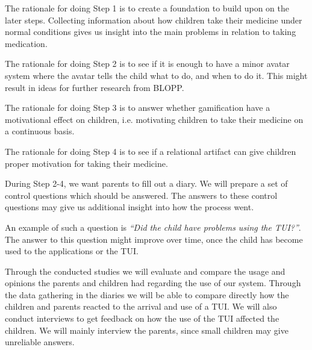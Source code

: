 The rationale for doing Step 1 is to create a foundation to build upon on the later steps. 
Collecting information about how children take their medicine under normal conditions gives us insight into the main problems in relation to taking medication.

The rationale for doing Step 2 is to see if it is enough to have a minor avatar system where the avatar tells the child what to do, and when to do it. This might result in ideas for further research from BLOPP. 


The rationale for doing Step 3 is to answer whether gamification have a motivational effect on children, i.e. motivating children to take their medicine on a continuous basis. 

The rationale for doing Step 4 is to see if a relational artifact can give children proper motivation for taking their medicine.

During Step 2-4, we want parents to fill out a diary. We will prepare a set of control questions which should be answered. The answers to these control questions may give us additional insight into how the process went.  


An example of such a question is \emph{``Did the child have problems using the TUI?''}. The answer to this question might improve over time, once the child has become used to the applications or the TUI.  


Through the conducted studies we will evaluate and compare the usage and opinions the parents and children had regarding the use of our system. Through the data gathering in the diaries we will be able to compare directly how the children and parents reacted to the arrival and use of a TUI. We will also conduct interviews to get feedback on how the use of the TUI affected the children. We will mainly interview the parents, since small children may give unreliable answers.
